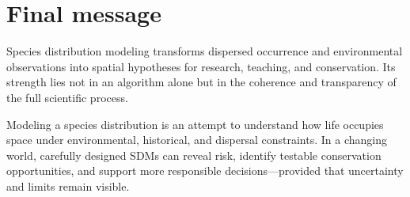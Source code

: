 \section{Final message}

Species distribution modeling transforms dispersed occurrence and environmental observations into spatial hypotheses for research, teaching, and conservation. Its strength lies not in an algorithm alone but in the coherence and transparency of the full scientific process.

\begin{conceito}[title={\faLeaf\quad Final reflection}]
Modeling a species distribution is an attempt to understand how life occupies space under environmental, historical, and dispersal constraints. In a changing world, carefully designed SDMs can reveal risk, identify testable conservation opportunities, and support more responsible decisions---provided that uncertainty and limits remain visible.
\end{conceito}
